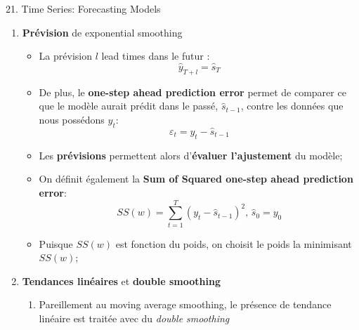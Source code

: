 \documentclass[12pt, titlepage, french]{report}
\begin{document}
\begin{CHPT_SUMM}[label = {timeseries21}]{21. Time Series: Forecasting Models}
\begin{enumerate}
\begin{itemize}
		\item	On peut réécrire l'expression de façon récursive :
			\begin{equation*}
			\hat{s}_{t}
				=	w \hat{s}_{t - 1} + (1 - w) y_{t}
			\end{equation*}
		\item	Le poids (weight), ou \textbf{smoothing factor}, est \textbf{contenu entre 0 et 1} et représente \textbf{la vitesse} à laquelle le poids de l'observation précédente va \textbf{décroître};
		\item[]	Alors, le plus faible $w$, le plus \textit{smooth} la série
		\item[]	Pour concrétiser, en un exemple de différentes poids:
		
		\texttt{[image: src/exponential-smoothing-example.png]}
		\end{itemize}
	\item[]	\textbf{Prévision} de exponential smoothing
		\begin{itemize}
		\item	La prévision $l$ lead times dans le futur :
			\begin{equation*}
			\hat{y}_{T + l}
				=	\hat{s}_{T}	
			\end{equation*}
		\item	De plus, le \textbf{one-step ahead prediction error} permet de comparer ce que le modèle aurait prédit dans le passé, $\hat{s}_{t - 1}$, contre les données que nous possédons $y_{t}$:
			\begin{equation*}
			\varepsilon_{t}
				=	y_{t} - \hat{s}_{t - 1}	
			\end{equation*}		
		\item[]	Les \textbf{prévisions} permettent alors d'\textbf{évaluer l'ajustement} du modèle;
		\item	On définit également la \textbf{Sum of Squared one-step ahead prediction error}:
			\begin{equation*}
			SS(w)
				=	\sum_{t = 1}^{T}(y_{t} - \hat{s}_{t - 1})^{2}, \, \hat{s}_{0} = y_{0}
			\end{equation*}
		\item[]	Puisque $SS(w)$ est fonction du poids, on choisit le poids la minimisant $SS(w)$;
		\end{itemize}	
	\item[]	\textbf{Tendances linéaires} et \textbf{double smoothing}
		\begin{enumerate}
		\item[]	Pareillement au moving average smoothing, le présence de tendance linéaire est traitée avec du \textit{double smoothing}

\end{enumerate}
\end{enumerate}
\end{CHPT_SUMM}
\end{document}
